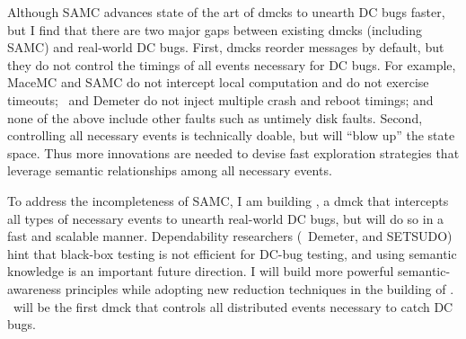 \documentclass[10pt]{article}
\begin{document}
Although SAMC advances state of the art of dmcks to unearth DC bugs faster, but
I find that there are two major gaps between existing dmcks (including SAMC) and
real-world DC bugs. First, dmcks reorder messages by default, but they do not
control the timings of all events necessary for DC bugs. For example, MaceMC and
SAMC do not intercept local computation and do not exercise timeouts; \modist\
and Demeter do not inject multiple crash and reboot timings; and none of the
above include other faults such as untimely disk faults.
%
Second, controlling all necessary events is technically doable, but will ``blow
up'' the state space. Thus more innovations are needed to devise fast
exploration strategies that leverage semantic relationships among all necessary
events.


To address the incompleteness of SAMC, I am building \fullcheck, a dmck that
intercepts all types of necessary events to unearth real-world DC bugs, but will
do so in a fast and scalable manner. Dependability researchers (\eg\ Demeter,
and SETSUDO) hint that black-box testing is not efficient for DC-bug testing,
and using semantic knowledge is an important future direction. I will build more
powerful semantic-awareness principles while adopting new reduction techniques
in the building of \fullcheck. \fullcheck\ will be the first dmck that controls
all distributed events necessary to catch DC bugs.


\end{document}
